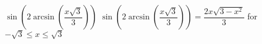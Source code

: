  {$\sin\left(2 \arcsin\left( \dfrac{x\sqrt{3}}{3} \right) \right)$}
{ $\sin\left(2 \arcsin\left( \dfrac{x\sqrt{3}}{3} \right) \right) = \dfrac{2x\sqrt{3-x^2}}{3}$ for $-\sqrt{3} \leq x \leq \sqrt{3}$}
